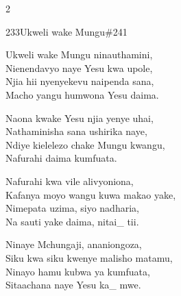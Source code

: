 \begin{multicols}{2}
\begin{hymn}{233}{Ukweli wake Mungu}{\#241}
\begin{stanza}
Ukweli wake Mungu ninauthamini,\\
Nienendavyo naye Yesu kwa upole,\\
Njia hii nyenyekevu naipenda sana,\\
Macho yangu humwona Yesu daima.
\end{stanza}
\begin{stanza}
Naona kwake Yesu njia yenye uhai,\\
Nathaminisha sana ushirika naye,\\
Ndiye kielelezo chake Mungu kwangu,\\
Nafurahi daima kumfuata.
\end{stanza}
\begin{stanza}
Nafurahi kwa vile alivyoniona,\\
Kafanya moyo wangu kuwa makao yake,\\
Nimepata uzima, siyo nadharia,\\
Na sauti yake daima, nitai\_ tii.
\end{stanza}
\begin{stanza}
Ninaye Mchungaji, ananiongoza,\\
Siku kwa siku kwenye malisho matamu,\\
Ninayo hamu kubwa ya kumfuata,\\
Sitaachana naye Yesu ka\_ mwe.
\end{stanza}
\end{hymn}


\end{multicols}

